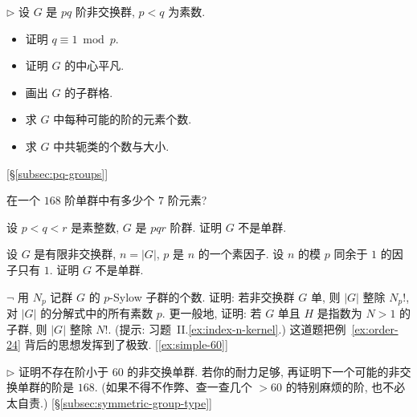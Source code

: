 \begin{prob}
\label{ex:pq-noncomm-details}
$\triangleright$ 设 $G$ 是 $pq$ 阶非交换群, $p < q$ 为素数.
\begin{itemize}
	\item 证明 $q \equiv 1 \bmod p$.
	\item 证明 $G$ 的中心平凡.
	\item 画出 $G$ 的子群格.
	\item 求 $G$ 中每种可能的阶的元素个数.
	\item 求 $G$ 中共轭类的个数与大小.
\end{itemize}
[\S\ref{subsec:pq-groups}]
\end{prob}

\begin{prob}
\label{ex:168-seven}
在一个 $168$ 阶单群中有多少个 $7$ 阶元素?
\end{prob}

\begin{prob}
\label{ex:pqr-not-simple}
设 $p < q < r$ 是素整数, $G$ 是 $pqr$ 阶群. 证明 $G$ 不是单群.
\end{prob}

\begin{prob}
\label{ex:unique-divisor-simple}
设 $G$ 是有限非交换群, $n = |G|$, $p$ 是 $n$ 的一个素因子. 设 $n$ 的模 $p$ 同余于 $1$ 的因子只有 $1$. 证明 $G$ 不是单群.
\end{prob}

\begin{prob}
\label{ex:simple-divides-factorial}
$\neg$ 用 $N_p$ 记群 $G$ 的 $p$-Sylow 子群的个数. 证明: 若非交换群 $G$ 单, 则 $|G|$ 整除 $N_p!$, 对 $|G|$ 的分解式中的所有素数 $p$. 更一般地, 证明: 若 $G$ 单且 $H$ 是指数为 $N>1$ 的子群, 则 $|G|$ 整除 $N!$. (提示: 习题~II.\ref{ex:index-n-kernel}.) 这道题把例~\ref{ex:order-24} 背后的思想发挥到了极致. [\ref{ex:simple-60}]
\end{prob}

\begin{prob}
\label{ex:no-simple-below-60}
$\triangleright$ 证明不存在阶小于 $60$ 的非交换单群. 若你的耐力足够, 再证明下一个可能的非交换单群的阶是 $168$. (如果不得不作弊、查一查几个 $> 60$ 的特别麻烦的阶, 也不必太自责.) [\S\ref{subsec:symmetric-group-type}]
\end{prob}

